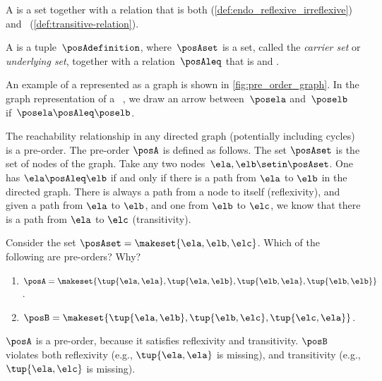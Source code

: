 A  is a set together with a relation that is both  (\cref{def:endo_reflexive_irreflexive}) and ~(\cref{def:transitive-relation}).
\begin{ctdefinition}
    \label{def:preorder}
    A  is a tuple~$\posAdefinition$, where~$\posAset$ is a set, called the \emph{carrier set} or \emph{underlying set}, together with a relation~$\posAleq$ that is
     and .
\end{ctdefinition}
An example of a  represented as a graph is shown in \cref{fig:pre_order_graph}.
In the graph representation of a ~\posA, we draw an arrow between~$\posela$ and~$\poselb$ if~$\posela \posAleq \poselb$.

\begin{example}
    The reachability relationship in any directed graph (potentially including cycles) is a pre-order.
    The pre-order $\posA$ is defined as follows.
    The set $\posAset$ is the set of nodes of the graph.
    Take any two nodes~$\ela,\elb \setin \posAset$.
    One has $\ela \posAleq \elb$ if and only if there is a path from $\ela$ to $\elb$ in the directed graph.
    There is always a path from a node to itself (reflexivity), and given a path from $\ela$ to $\elb$, and one from $\elb$ to $\elc$, we know that there is a path from $\ela$ to $\elc$ (transitivity).
\end{example}

\begin{exercise}
    \label{ex:findpreorders}
    Consider the set $\posAset=\makeset{\ela,\elb,\elc}$.
    Which of the following are pre-orders? Why?
    \begin{enumerate}
        \item $\posA= \makeset{\tup{\ela,\ela},\tup{\ela,\elb},\tup{\elb,\ela},\tup{\elb,\elb}}$.
        \item $\posB= \makeset{\tup{\ela,\elb},\tup{\elb,\elc},\tup{\elc,\ela}}$.
    \end{enumerate}
\end{exercise}

\begin{solution}
    $\posA$ is a pre-order, because it satisfies reflexivity and transitivity.
    $\posB$ violates both reflexivity (e.g., $\tup{\ela,\ela}$ is missing), and transitivity (e.g., $\tup{\ela,\elc}$ is missing).
\end{solution}


